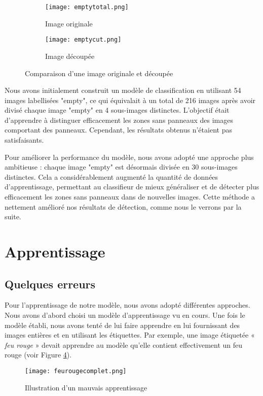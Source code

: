 \documentclass[twocolumn,10pt]{article}
\begin{document}
    \begin{figure}[H]
        \centering
        \begin{subfigure}[t]{0.45\linewidth}
            \centering
            \texttt{[image: emptytotal.png]}
            \caption{Image originale}
            \label{fig:image-originale}
        \end{subfigure}
        \hfill
        \begin{subfigure}[t]{0.49\linewidth}
            \centering
            \texttt{[image: emptycut.png]}
            \caption{Image découpée}
            \label{fig:enter-label}
        \end{subfigure}
        \caption{Comparaison d'une image originale et découpée}
        \label{fig:comparaison-images2}
    \end{figure}

    Nous avons initialement construit un modèle de classification en utilisant 54 images labellisées "empty", ce qui équivalait à un total de 216 images après avoir divisé chaque image "empty" en 4 sous-images distinctes. L'objectif était d'apprendre à distinguer efficacement les zones sans panneaux des images comportant des panneaux. Cependant, les résultats obtenus n'étaient pas satisfaisants.

    Pour améliorer la performance du modèle, nous avons adopté une approche plus ambitieuse : chaque image "empty" est désormais divisée en 30 sous-images distinctes. Cela a considérablement augmenté la quantité de données d'apprentissage, permettant au classifieur de mieux généraliser et de détecter plus efficacement les zones sans panneaux dans de nouvelles images. Cette méthode a nettement amélioré nos résultats de détection, comme nous le verrons par la suite.

    \section{Apprentissage}
    \subsection{Quelques erreurs}
    Pour l’apprentissage de notre modèle, nous avons adopté différentes approches. Nous avons d’abord choisi un modèle d’apprentissage vu en cours. Une fois le modèle établi, nous avons tenté de lui faire apprendre en lui fournissant des images entières et en utilisant les étiquettes. Par exemple, une image étiquetée « \textit{feu rouge} » devait apprendre au modèle qu’elle contient effectivement un feu rouge (voir Figure \ref{fig:mauvais-apprentissage}).
    \begin{figure}[H]
        \centering
        \texttt{[image: feurougecomplet.png]}
        \caption{Illustration d'un mauvais apprentissage}
        \label{fig:mauvais-apprentissage}
    \end{figure}
\end{document}
